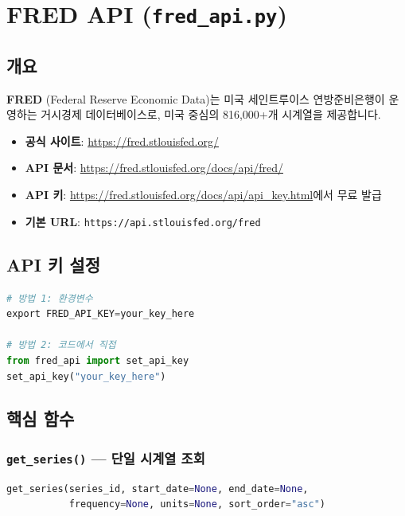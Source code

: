 \documentclass[11pt,a4paper]{article}
\newcommand{\code}[1]{\texttt{#1}}
\newcommand{\file}[1]{\texttt{\textcolor{string}{#1}}}
\begin{document}
\section{FRED API (\file{fred\_api.py})}

\subsection{개요}

\textbf{FRED} (Federal Reserve Economic Data)는 미국 세인트루이스 연방준비은행이 운영하는
거시경제 데이터베이스로, 미국 중심의 816,000+개 시계열을 제공합니다.

\begin{itemize}[leftmargin=2em]
    \item \textbf{공식 사이트}: \url{https://fred.stlouisfed.org/}
    \item \textbf{API 문서}: \url{https://fred.stlouisfed.org/docs/api/fred/}
    \item \textbf{API 키}: \url{https://fred.stlouisfed.org/docs/api/api_key.html}에서 무료 발급
    \item \textbf{기본 URL}: \code{https://api.stlouisfed.org/fred}
\end{itemize}

\subsection{API 키 설정}

\begin{lstlisting}[language=Python]
# 방법 1: 환경변수
export FRED_API_KEY=your_key_here

# 방법 2: 코드에서 직접
from fred_api import set_api_key
set_api_key("your_key_here")
\end{lstlisting}

\subsection{핵심 함수}

\subsubsection{\code{get\_series()} --- 단일 시계열 조회}

\begin{lstlisting}[language=Python]
get_series(series_id, start_date=None, end_date=None,
           frequency=None, units=None, sort_order="asc")
\end{lstlisting}
\end{document}
